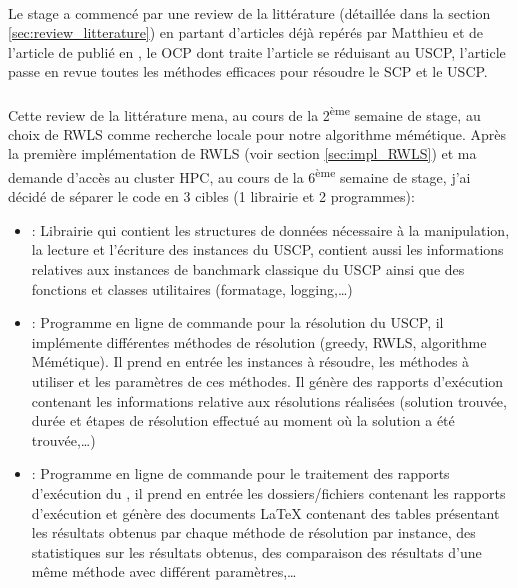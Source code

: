 \documentclass[a4paper,11pt,twoside,french,report]{../common/simplem}
\begin{document}
				\paragraph*{}
					Le stage a commencé par une review de la littérature (détaillée dans la section \ref{sec:review_litterature}) en partant d'articles déjà repérés par Matthieu et de l'article  de \citeauthor{Kritter2019} publié en \citeyear{Kritter2019}, le \gls{OCP} dont traite l'article se réduisant au \gls{USCP}, l'article passe en revue toutes les méthodes efficaces pour résoudre le \gls{SCP} et le \gls{USCP}.
				\paragraph*{}
					Cette review de la littérature mena, au cours de la 2\textsuperscript{ème} semaine de stage, au choix de \gls{RWLS} comme recherche locale pour notre algorithme mémétique. Après la première implémentation de \gls{RWLS} (voir section \ref{sec:impl_RWLS}) et ma demande d'accès au cluster \gls{HPC}, au cours de la 6\textsuperscript{ème} semaine de stage, j'ai décidé de séparer le code en 3 cibles (1 librairie et 2 programmes):
					\begin{itemize}
						\item \common{}: Librairie qui contient les structures de données nécessaire à la manipulation, la lecture et l'écriture des instances du \gls{USCP}, contient aussi les informations relatives aux instances de banchmark classique du \gls{USCP} ainsi que des fonctions et classes utilitaires (formatage, logging,\ldots)
						\item \solver{}: Programme en ligne de commande pour la résolution du \gls{USCP}, il implémente différentes méthodes de résolution (greedy, \gls{RWLS}, algorithme Mémétique). Il prend en entrée les instances à résoudre, les méthodes à utiliser et les paramètres de ces méthodes. Il génère des rapports d'exécution contenant les informations relative aux résolutions réalisées (solution trouvée, durée et étapes de résolution effectué au moment où la solution a été trouvée,\ldots)
						\item \printer{}: Programme en ligne de commande pour le traitement des rapports d'exécution du \solver{}, il prend en entrée les dossiers/fichiers contenant les rapports d'exécution et génère des documents \LaTeX{} contenant des tables présentant les résultats obtenus par chaque méthode de résolution par instance, des statistiques sur les résultats obtenus, des comparaison des résultats d'une même méthode avec différent paramètres,\ldots
					\end{itemize}
\end{document}
